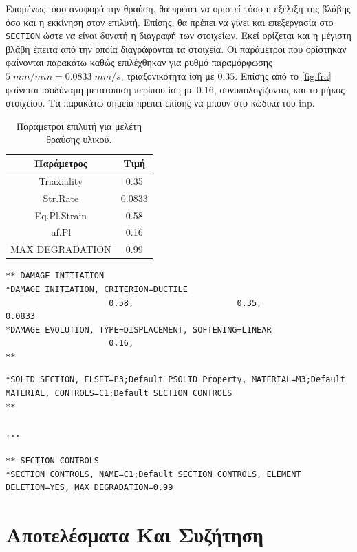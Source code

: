 \documentclass{article}
\begin{document}
\par Επομένως, όσο αναφορά την θραύση, θα πρέπει να οριστεί τόσο η εξέλιξη της βλάβης όσο και η εκκίνηση στον επιλυτή. Επίσης, θα πρέπει να γίνει και επεξεργασία στο \texttt{SECTION} ώστε να είναι δυνατή η διαγραφή των στοιχείων. Εκεί ορίζεται και η μέγιστη βλάβη έπειτα από την οποία διαγράφονται τα στοιχεία. Οι παράμετροι που ορίστηκαν φαίνονται παρακάτω καθώς επιλέχθηκαν για ρυθμό παραμόρφωσης $5\; mm/min = 0.0833\; mm/s$, τριαξονικότητα ίση με $0.35$. Επίσης από το \ref{fig:fra} φαίνεται ισοδύναμη μετατόπιση περίπου ίση με $0.16$, συνυπολογίζοντας και το μήκος στοιχείου. Τα παρακάτω σημεία πρέπει επίσης να μπουν στο κώδικα του inp.

\begin{table}[H]
    \centering
        \begin{tabular}{|c|c|}
        \hline
        \rowcolor{Dandelion}
        Παράμετρος & Τιμή\\
        \hline
        Triaxiality & 0.35\\
        \hline
        Str.Rate & 0.0833\\
        \hline
        Eq.Pl.Strain & 0.58\\
        \hline
        uf.Pl & 0.16\\
        \hline
        MAX DEGRADATION & 0.99\\
        \hline
        \end{tabular}
    \caption{Παράμετροι επιλυτή για μελέτη θραύσης υλικού.}
    \label{tab:tablabel}
\end{table}


\begin{lstlisting}
** DAMAGE INITIATION
*DAMAGE INITIATION, CRITERION=DUCTILE
                     0.58,                     0.35,                   0.0833
*DAMAGE EVOLUTION, TYPE=DISPLACEMENT, SOFTENING=LINEAR
                     0.16,
**
\end{lstlisting}


\begin{lstlisting}
*SOLID SECTION, ELSET=P3;Default PSOLID Property, MATERIAL=M3;Default MATERIAL, CONTROLS=C1;Default SECTION CONTROLS
**

...

** SECTION CONTROLS
*SECTION CONTROLS, NAME=C1;Default SECTION CONTROLS, ELEMENT DELETION=YES, MAX DEGRADATION=0.99
\end{lstlisting}

\section{Αποτελέσματα Και Συζήτηση}
\end{document}
